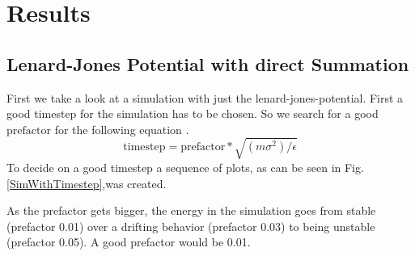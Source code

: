 \chapter{Results}

\section{Lenard-Jones Potential with direct Summation}

First we take a look at a simulation with just the lenard-jones-potential. 
First a good timestep for the simulation has to be chosen. 
So we search for a good $ \mathrm{prefactor} $ for the following equation \cite{molDymCourse}.
\begin{equation}
	\label{timestepDeterminant}
 \mathrm{timestep} = \mathrm{prefactor} * \sqrt{(m\sigma^2)/\epsilon} 
\end{equation}
To decide on a good timestep a sequence of plots, as can be seen in Fig. \ref{SimWithTimestep},was created. 
\par 
As the prefactor gets bigger, the energy in the simulation goes from stable (prefactor 0.01) over a drifting behavior (prefactor 0.03) to being unstable (prefactor 0.05). A good prefactor would be 0.01.

